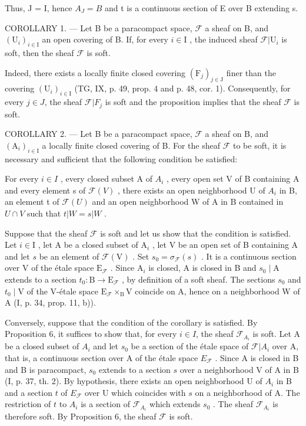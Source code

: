 Thus, J = I, hence \(A_{J} = B\) and t is a continuous section of E over B extending s.

COROLLARY 1. --- Let B be a paracompact space, \(\mathcal{F}\) a sheaf on B, and \((\mathrm{U}_i)_{i\in \mathrm{I}}\) an open covering of B. If, for every \(i\in \mathrm{I}\) , the induced sheaf \(\mathcal{F}|\mathrm{U}_i\) is soft, then the sheaf \(\mathcal{F}\) is soft.

Indeed, there exists a locally finite closed covering \((\mathrm{F}_{j})_{j\in\mathrm{J}}\) finer than the covering \((\mathrm{U}_{i})_{i\in\mathrm{I}}\) (TG, IX, p. 49, prop. 4 and p. 48, cor. 1). Consequently, for every \(j\in J\), the sheaf \(\mathcal{F}|F_{j}\) is soft and the proposition implies that the sheaf \(\mathcal{F}\) is soft.

COROLLARY 2. --- Let B be a paracompact space, \(\mathcal{F}\) a sheaf on B, and \((\mathrm{A}_i)_{i\in \mathrm{I}}\) a locally finite closed covering of B. For the sheaf \(\mathcal{F}\) to be soft, it is necessary and sufficient that the following condition be satisfied:

For every \(i \in I\) , every closed subset A of \(A_{i}\) , every open set V of B containing A and every element s of \(\mathcal{F}(V)\) , there exists an open neighborhood U of \(A_{i}\) in B, an element t of \(\mathcal{F}(U)\) and an open neighborhood W of A in B contained in \(U \cap V\) such that \(t | W = s | W\) .

Suppose that the sheaf \(\mathcal{F}\) is soft and let us show that the condition is satisfied. Let \(i\in\mathrm{I}\) , let A be a closed subset of \(\mathrm{A}_{i}\) , let V be an open set of B containing A and let \(s\) be an element of \(\mathcal{F}(\mathrm{V})\) . Set \(s_{0}=\sigma_{\mathcal{F}}(s)\) . It is a continuous section over V of the étale space \(\mathrm{E}_{\mathcal{F}}\) . Since \(\mathrm{A}_{i}\) is closed, A is closed in B and \(s_{0}\mid\mathrm{A}\) extends to a section \(t_{0}\colon\mathrm{B}\to\mathrm{E}_{\mathcal{F}}\) , by definition of a soft sheaf. The sections \(s_{0}\) and \(t_{0}\mid\mathrm{V}\) of the V-étale space \(\mathrm{E}_{\mathcal{F}}\times_{\mathrm{B}}\mathrm{V}\) coincide on A, hence on a neighborhood W of A (I, p. 34, prop. 11, b)).

Conversely, suppose that the condition of the corollary is satisfied. By Proposition 6, it suffices to show that, for every \(i \in I\), the sheaf \(\mathcal{F}_{A_i}\) is soft. Let A be a closed subset of \(A_i\) and let \(s_0\) be a section of the étale space of \(\mathcal{F} | A_i\) over A, that is, a continuous section over A of the étale space \(E_{\mathcal{F}}\) . Since A is closed in B and B is paracompact, \(s_0\) extends to a section \(s\) over a neighborhood V of A in B (I, p. 37, th. 2). By hypothesis, there exists an open neighborhood U of \(A_i\) in B and a section \(t\) of \(E_{\mathcal{F}}\) over U which coincides with \(s\) on a neighborhood of A. The restriction of \(t\) to \(A_i\) is a section of \(\mathcal{F}_{A_i}\) which extends \(s_0\) . The sheaf \(\mathcal{F}_{A_i}\) is therefore soft. By Proposition 6, the sheaf \(\mathcal{F}\) is soft.

